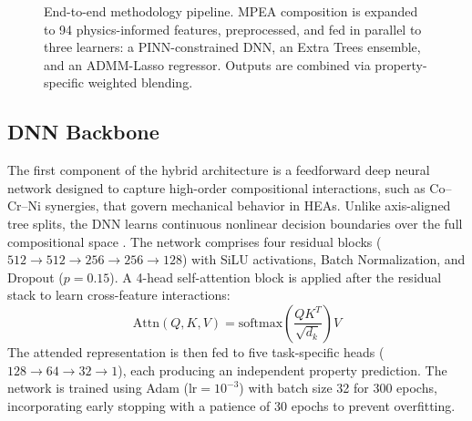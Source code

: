 \documentclass[conference]{IEEEtran}
\begin{document}
\begin{figure}[t]
{%
}
\caption{End-to-end methodology pipeline. MPEA composition is expanded to 94 physics-informed features, preprocessed, and fed in parallel to three learners: a PINN-constrained DNN, an Extra Trees ensemble, and an ADMM-Lasso regressor. Outputs are combined via property-specific weighted blending.}
\label{fig:flowchart}
\end{figure}

\subsection{DNN Backbone}
The first component of the hybrid architecture is a feedforward deep neural network designed to capture high-order compositional interactions, such as Co--Cr--Ni synergies, that govern mechanical behavior in HEAs. Unlike axis-aligned tree splits, the DNN learns continuous nonlinear decision boundaries over the full compositional space \cite{b10}. The network comprises four residual blocks ($512 \to 512 \to 256 \to 256 \to 128$) with SiLU activations, Batch Normalization, and Dropout ($p=0.15$). A 4-head self-attention block is applied after the residual stack to learn cross-feature interactions:
\begin{equation}
\text{Attn}(Q,K,V) = \text{softmax}\!\left(\frac{QK^T}{\sqrt{d_k}}\right)\!V
\end{equation}
The attended representation is then fed to five task-specific heads ($128 \to 64 \to 32 \to 1$), each producing an independent property prediction. The network is trained using Adam ($\text{lr}=10^{-3}$) with batch size 32 for 300 epochs, incorporating early stopping with a patience of 30 epochs to prevent overfitting.
\end{document}
